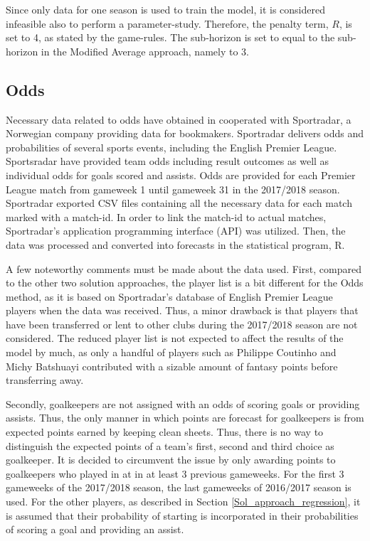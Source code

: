 \newpar

Since only data for one season is used to train the model, it is considered infeasible also to perform a parameter-study. Therefore, the penalty term, $R$, is set to 4, as stated by the game-rules. The sub-horizon is set to equal to the sub-horizon in the Modified Average approach, namely to 3.

\subsection{Odds}

Necessary data related to odds have obtained in cooperated with Sportradar, a Norwegian company providing data for bookmakers. Sportradar delivers odds and probabilities of several sports events, including the English Premier League. Sportsradar have provided team odds including result outcomes as well as individual odds for goals scored and assists. Odds are provided for each Premier League match from gameweek 1 until gameweek 31 in the 2017/2018 season. Sportradar exported CSV files containing all the necessary data for each match marked with a match-id. In order to link the match-id to actual matches, Sportradar's 
application programming interface (API) was utilized. Then, the data was processed and converted into forecasts in the statistical program, R.

\newpar

A few noteworthy comments must be made about the data used. First, compared to the other two solution approaches, the player list is a bit different for the Odds method, as it is based on Sportradar's database of English Premier League players when the data was received. Thus, a minor drawback is that players that have been transferred or lent to other clubs during the 2017/2018 season are not considered. The reduced player list is not expected to affect the results of the model by much, as only a handful of players such as Philippe Coutinho and Michy Batshuayi contributed with a sizable amount of fantasy points before transferring away. 

\newpar

Secondly, goalkeepers are not assigned with an odds of scoring goals or providing assists. Thus, the only manner in which points are forecast for goalkeepers is from expected points earned by keeping clean sheets. Thus, there is no way to distinguish the expected points of a team's first, second and third choice as goalkeeper. It is decided to circumvent the issue by only awarding points to goalkeepers who played in at in at least 3 previous gameweeks. For the first 3 gameweeks of the 2017/2018 season, the last gameweeks of 2016/2017 season is used. For the other players, as described in Section \ref{Sol_approach_regression}, it is assumed that their probability of starting is incorporated in their probabilities of scoring a goal and providing an assist.

